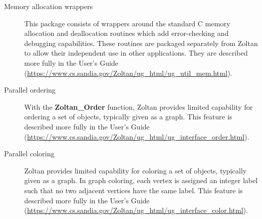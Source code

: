 \begin{description}
\item [Memory allocation wrappers]
This package consists of wrappers around the standard C memory allocation and 
deallocation routines which add error-checking and debugging capabilities. These 
routines are packaged separately from Zoltan to allow their independent use in other 
applications. 
They are described more fully in the User's Guide
(\url{https://www.cs.sandia.gov/Zoltan/ug\_html/ug\_util\_mem.html}).

\item [Parallel ordering]
With the \textbf{Zoltan\_Order} function,
Zoltan provides limited capability for ordering a set of objects, typically 
given as a graph.
This feature is described more fully in the User's Guide
(\url{https://www.cs.sandia.gov/Zoltan/ug\_html/ug\_interface\_order.html}).

\item [Parallel coloring]
Zoltan provides limited capability for coloring a set of objects, typically given 
as a graph. In graph coloring, each vertex is assigned an integer label such 
that no two adjacent vertices have the same label. 
This feature is described more fully in the User's Guide
(\url{https://www.cs.sandia.gov/Zoltan/ug\_html/ug\_interface\_color.html}).
\end{description}

